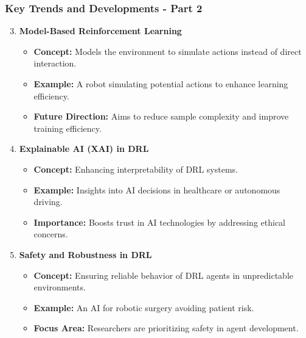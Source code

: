 \documentclass[aspectratio=169]{beamer}
\begin{document}
\begin{frame}[fragile]
    \frametitle{Key Trends and Developments - Part 2}
    \begin{enumerate}
        \setcounter{enumi}{2} %
        \item \textbf{Model-Based Reinforcement Learning}
            \begin{itemize}
                \item \textbf{Concept:} Models the environment to simulate actions instead of direct interaction.
                \item \textbf{Example:} A robot simulating potential actions to enhance learning efficiency.
                \item \textbf{Future Direction:} Aims to reduce sample complexity and improve training efficiency.
            \end{itemize}
        
        \item \textbf{Explainable AI (XAI) in DRL}
            \begin{itemize}
                \item \textbf{Concept:} Enhancing interpretability of DRL systems.
                \item \textbf{Example:} Insights into AI decisions in healthcare or autonomous driving.
                \item \textbf{Importance:} Boosts trust in AI technologies by addressing ethical concerns.
            \end{itemize}
        
        \item \textbf{Safety and Robustness in DRL}
            \begin{itemize}
                \item \textbf{Concept:} Ensuring reliable behavior of DRL agents in unpredictable environments.
                \item \textbf{Example:} An AI for robotic surgery avoiding patient risk.
                \item \textbf{Focus Area:} Researchers are prioritizing safety in agent development.
            \end{itemize}
    \end{enumerate}
\end{frame}
\end{document}
